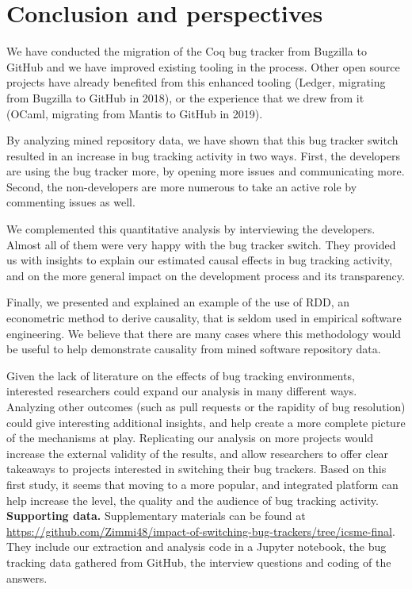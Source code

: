 \documentclass[conference]{IEEEtran}
\begin{document}
\section{Conclusion and perspectives}
\label{conclusion}
We have conducted the migration of the Coq bug tracker from Bugzilla to GitHub and we have improved existing tooling in the process. Other open source projects have already benefited from this enhanced tooling (Ledger, migrating from Bugzilla to GitHub in 2018), or the experience that we drew from it (OCaml, migrating from Mantis to GitHub in 2019).

By analyzing mined repository data, we have shown that this bug tracker switch resulted in an increase in bug tracking activity in two ways. First, the developers are using the bug tracker more, by opening more issues and communicating more. Second, the non-developers are more numerous to take an active role by commenting issues as well.

We complemented this quantitative analysis by interviewing the developers. Almost all of them were very happy with the bug tracker switch. They provided us with insights to explain our estimated causal effects in bug tracking activity, and on the more general impact on the development process and its transparency.

Finally, we presented and explained an example of the use of RDD, an econometric method to derive causality, that is seldom used in empirical software engineering. We believe that there are many cases where this methodology would be useful to help demonstrate causality from mined software repository data.

Given the lack of literature on the effects of bug tracking environments, interested researchers could expand our analysis in many different ways. Analyzing other outcomes (such as pull requests or the rapidity of bug resolution) could give interesting additional insights, and help create a more complete picture of the mechanisms at play.
Replicating our analysis on more projects would increase the external validity of the results, and allow researchers to offer clear takeaways to projects interested in switching their bug trackers. Based on this first study, it seems that moving to a more popular, and integrated platform can help increase the level, the quality and the audience of bug tracking activity. \\

\scriptsize
\noindent \footnotesize{\textbf{Supporting data.}}
Supplementary materials can be found at \url{https://github.com/Zimmi48/impact-of-switching-bug-trackers/tree/icsme-final}. They include our extraction and analysis code in a Jupyter notebook, the bug tracking data gathered from GitHub, the interview questions and coding of the answers.
\end{document}
